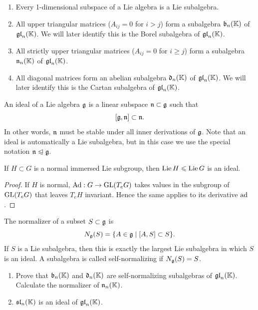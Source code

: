 \begin{example}
    \begin{enumerate}
        \item Every 1-dimensional subspace of a Lie algebra is a Lie subalgebra.
        \item All upper triangular matrices ($A_{ij}=0$ for $i>j$) form a subalgebra $\mathfrak{b}_n(\mathbb{K})$ of $\mathfrak{gl}_n(\mathbb{K})$. We will later identify this is the Borel subalgebra of $\mathfrak{gl}_n(\mathbb{K})$.
        \item All strictly upper triangular matrices ($A_{ij}=0$ for $i\geq j$) form a subalgebra $\mathfrak{n}_n(\mathbb{K})$ of $\mathfrak{gl}_n(\mathbb{K})$.
        \item All diagonal matrices form an abelian subalgebra $\mathfrak{d}_n(\mathbb{K})$ of $\mathfrak{gl}_n(\mathbb{K})$. We will later identify this is the Cartan subalgebra of $\mathfrak{gl}_n(\mathbb{K})$.
    \end{enumerate}
\end{example}



\begin{defn}[Ideal]
    An ideal of a Lie algebra $\mathfrak{g}$ is a linear subspace $\mathfrak{n}\subset\mathfrak{g}$ such that
    \[[\mathfrak{g},\mathfrak{n}]\subset \mathfrak{n}.\]
    In other words, $\mathfrak{n}$ must be stable under all inner derivations of $\mathfrak{g}$. Note that an ideal is automatically a Lie subalgebra, but in this case we use the special notation $\mathfrak{n}\trianglelefteqslant \mathfrak{g}$.
\end{defn}

\begin{prop}
    If $H\subset G$ is a normal immersed Lie subgroup, then $\operatorname{Lie} H\leqslant \operatorname{Lie} G$ is an ideal.
\end{prop}
\begin{proof}
    If $H$ is normal, $\mathrm{Ad}:G\to \operatorname{GL}(T_eG)$ takes values in the subgroup of $\operatorname{GL}(T_eG)$ that leaves $T_e H$ invariant. Hence the same applies to its derivative $\mathrm{ad}$.
\end{proof}

\begin{defn}
    The normalizer of a subset $S\subset \mathfrak{g}$ is
    \[N_{\mathfrak{g}}(S)=\{A\in\mathfrak{g}\mid [A,S]\subset S\}.\]
    If $S$ is a Lie subalgebra, then this is exactly the largest Lie subalgebra in which $S$ is an ideal. A subalgebra is called self-normalizing if $N_{\mathfrak{g}}(S)=S$.
\end{defn}

\begin{xca}
    \begin{enumerate}
         \item Prove that $\mathfrak{b}_n(\mathbb{K})$ and $\mathfrak{d}_n(\mathbb{K})$ are self-normalizing subalgebras of $\mathfrak{gl}_n(\mathbb{K})$. Calculate the normalizer of $\mathfrak{n}_n(\mathbb{K})$.
         \item $\mathfrak{sl}_n(\mathbb{K})$ is an ideal of $\mathfrak{gl}_n(\mathbb{K})$.
    \end{enumerate}
\end{xca}


